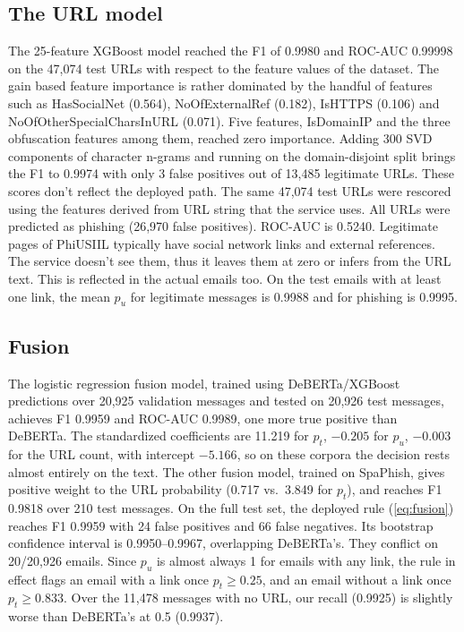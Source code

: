 \documentclass[conference]{IEEEtran}
\begin{document}
\subsection{The URL model}
The 25-feature XGBoost model reached the F1 of 0.9980 and ROC-AUC 0.99998 on the 47,074 test URLs with respect to the feature values of the dataset. The gain based feature importance is rather dominated by the handful of features such as HasSocialNet (0.564), NoOfExternalRef (0.182), IsHTTPS (0.106) and NoOfOtherSpecialCharsInURL (0.071). Five features, IsDomainIP and the three obfuscation features among them, reached zero importance. Adding 300 SVD components of character n-grams and running on the domain-disjoint split brings the F1 to 0.9974 with only 3 false positives out of 13,485 legitimate URLs. These scores don't reflect the deployed path. The same 47,074 test URLs were rescored using the features derived from URL string that the service uses. All URLs were predicted as phishing (26,970 false positives). ROC-AUC is 0.5240. Legitimate pages of PhiUSIIL typically have social network links and external references. The service doesn't see them, thus it leaves them at zero or infers from the URL text. This is reflected in the actual emails too. On the test emails with at least one link, the mean $p_u$ for legitimate messages is 0.9988 and for phishing is 0.9995.

\subsection{Fusion}
The logistic regression fusion model, trained using DeBERTa/XGBoost predictions over 20,925 validation messages and tested on 20,926 test messages, achieves F1 0.9959 and ROC-AUC 0.9989, one more true positive than DeBERTa. The standardized coefficients are 11.219 for $p_t$, $-0.205$ for $p_u$, $-0.003$ for the URL count, with intercept $-5.166$, so on these corpora the decision rests almost entirely on the text. The other fusion model, trained on SpaPhish, gives positive weight to the URL probability (0.717 vs.\ 3.849 for $p_t$), and reaches F1 0.9818 over 210 test messages. On the full test set, the deployed rule (\ref{eq:fusion}) reaches F1 0.9959 with 24 false positives and 66 false negatives. Its bootstrap confidence interval is 0.9950--0.9967, overlapping DeBERTa's. They conflict on 20/20,926 emails. Since $p_u$ is almost always 1 for emails with any link, the rule in effect flags an email with a link once $p_t \ge 0.25$, and an email without a link once $p_t \ge 0.833$. Over the 11,478 messages with no URL, our recall (0.9925) is slightly worse than DeBERTa's at 0.5 (0.9937).
\end{document}
